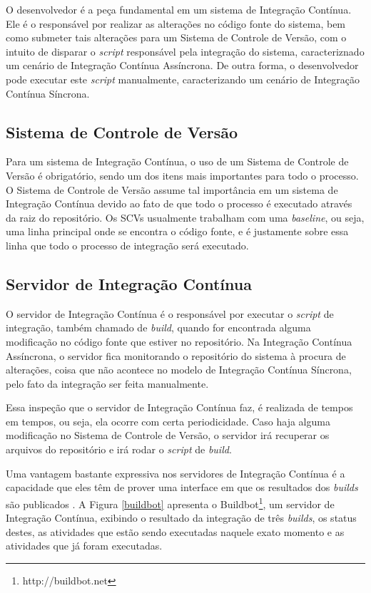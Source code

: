 O desenvolvedor é a peça fundamental em um sistema de Integração Contínua. Ele é o responsável por realizar as alterações no código fonte do sistema, bem como submeter tais alterações para um Sistema de Controle de Versão, com o intuito de disparar o \textit{script} responsável pela integração do sistema, caracteriznado um cenário de Integração Contínua Assíncrona. De outra forma, o desenvolvedor pode executar este \textit{script} manualmente, caracterizando um cenário de Integração Contínua Síncrona.

\subsection{Sistema de Controle de Versão}

Para um sistema de Integração Contínua, o uso de um Sistema de Controle de Versão é obrigatório, sendo um dos itens mais importantes para todo o processo. O Sistema de Controle de Versão assume tal importância em um sistema de Integração Contínua devido ao fato de que todo o processo é executado através da raiz do repositório. Os SCVs usualmente trabalham com uma \textit{baseline}, ou seja, uma linha principal onde se encontra o código fonte, e é justamente sobre essa linha que todo o processo de integração será executado.

\subsection{Servidor de Integração Contínua}

O servidor de Integração Contínua é o responsável por executar o \textit{script} de integração, também chamado de \textit{build}, quando for encontrada alguma modificação no código fonte que estiver no repositório. Na Integração Contínua Assíncrona, o servidor fica monitorando o repositório do sistema à procura de alterações, coisa que não acontece no modelo de Integração Contínua Síncrona, pelo fato da integração ser feita manualmente.

Essa inspeção que o servidor de Integração Contínua faz, é realizada de tempos em tempos, ou seja, ela ocorre com certa periodicidade. Caso haja alguma modificação no Sistema de Controle de Versão, o servidor irá recuperar os arquivos do repositório e irá rodar o \textit{script} de \textit{build}.

Uma vantagem bastante expressiva nos servidores de Integração Contínua é a capacidade que eles têm de prover uma interface em que os resultados dos \textit{builds} são publicados \cite{FOWLER}. A Figura \ref{buildbot} apresenta o Buildbot\footnote{http://buildbot.net}, um servidor de Integração Contínua, exibindo o resultado da integração de três \textit{builds}, os status destes, as atividades que estão sendo executadas naquele exato momento e as atividades que já foram executadas.

